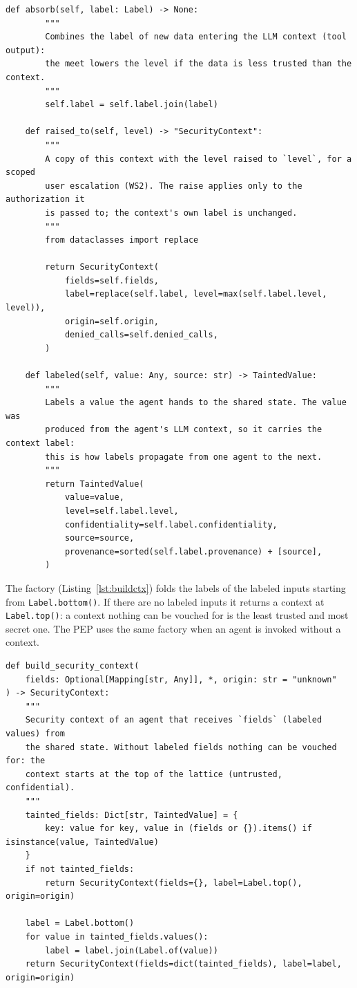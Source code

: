 \documentclass[11pt,a4paper]{article}
\DeclareRobustCommand{\code}[1]{{\renewcommand{\_}{\textunderscore\allowbreak}\texttt{#1}}}
\begin{document}
\begin{lstlisting}[firstnumber=44,style=py,caption={Security context: absorb, scoped raise, labeling (\texttt{security/security\_context.py}, lines 44--78)},label={lst:ctxmethods}]
    def absorb(self, label: Label) -> None:
        """
        Combines the label of new data entering the LLM context (tool output):
        the meet lowers the level if the data is less trusted than the context.
        """
        self.label = self.label.join(label)

    def raised_to(self, level) -> "SecurityContext":
        """
        A copy of this context with the level raised to `level`, for a scoped
        user escalation (WS2). The raise applies only to the authorization it
        is passed to; the context's own label is unchanged.
        """
        from dataclasses import replace

        return SecurityContext(
            fields=self.fields,
            label=replace(self.label, level=max(self.label.level, level)),
            origin=self.origin,
            denied_calls=self.denied_calls,
        )

    def labeled(self, value: Any, source: str) -> TaintedValue:
        """
        Labels a value the agent hands to the shared state. The value was
        produced from the agent's LLM context, so it carries the context label:
        this is how labels propagate from one agent to the next.
        """
        return TaintedValue(
            value=value,
            level=self.label.level,
            confidentiality=self.label.confidentiality,
            source=source,
            provenance=sorted(self.label.provenance) + [source],
        )
\end{lstlisting}

The factory (Listing~\ref{lst:buildctx}) folds the labels of the labeled inputs starting
from \code{Label.bottom()}. If there are no labeled inputs it returns a context at
\code{Label.top()}: a context nothing can be vouched for is the least trusted and most
secret one. The PEP uses the same factory when an agent is invoked without a context.

\begin{lstlisting}[firstnumber=81,style=py,caption={Building a security context from labeled inputs (\texttt{security/security\_context.py}, lines 81--98)},label={lst:buildctx}]
def build_security_context(
    fields: Optional[Mapping[str, Any]], *, origin: str = "unknown"
) -> SecurityContext:
    """
    Security context of an agent that receives `fields` (labeled values) from
    the shared state. Without labeled fields nothing can be vouched for: the
    context starts at the top of the lattice (untrusted, confidential).
    """
    tainted_fields: Dict[str, TaintedValue] = {
        key: value for key, value in (fields or {}).items() if isinstance(value, TaintedValue)
    }
    if not tainted_fields:
        return SecurityContext(fields={}, label=Label.top(), origin=origin)

    label = Label.bottom()
    for value in tainted_fields.values():
        label = label.join(Label.of(value))
    return SecurityContext(fields=dict(tainted_fields), label=label, origin=origin)
\end{lstlisting}
\end{document}
